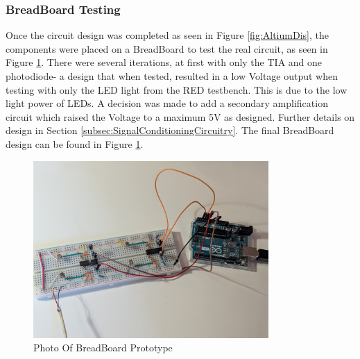 %
%
\subsubsection*{BreadBoard Testing}

Once the circuit design was completed as seen in Figure  \ref{fig:AltiumDis}, the components were placed on a BreadBoard to test the real circuit, as seen in Figure \ref{fig:BreadBoardPhoto}. 
There were several iterations, at first with only the \ac{TIA} and one photodiode- a design that when tested, resulted in a low Voltage output when testing with only the \ac{LED} light from the \ac{RED} testbench. This is due to the low light power of \acp{LED}. A decision was made to add a secondary amplification circuit which raised the Voltage to a maximum 5V as designed. Further details on design in Section \ref{subsec:SignalConditioningCircuitry}. The final BreadBoard design can be found in Figure \ref{fig:BreadBoardPhoto}.



%
\begin{figure}[htbp] %
  \centering
  \includegraphics[width=0.8\textwidth]{chapters/methodology/prototype/BreadBoardPhoto.jpg}
  \caption{Photo Of BreadBoard Prototype}
  \label{fig:BreadBoardPhoto}
\end{figure}

